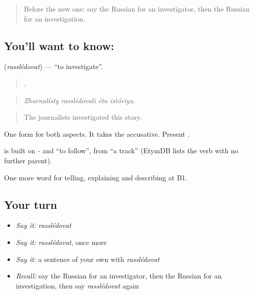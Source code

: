 \label{lesson:RU-C291-rassledovat}



\begin{quote}
Before the new one: say the Russian for an investigator, then the Russian for an investigation.
\end{quote}

\subsection*{You'll want to know: }
\textbf{} (\emph{rasslédovat}) — \textquotedblleft{}to investigate\textquotedblright{}.

\begin{quote}
   .
\end{quote}

\begin{quote}
\emph{Zhurnalísty rasslédovali étu istóriyu.}
\end{quote}

\begin{quote}
The journalists investigated this story.
\end{quote}

One form for both aspects. It takes the accusative. Present \emph{}.

\begin{cousinweb}
\emph{} is built on \emph{-} and \emph{} \textquotedblleft{}to follow\textquotedblright{}, from \emph{} \textquotedblleft{}a track\textquotedblright{} (EtymDB lists the verb with no further parent).
\end{cousinweb}

\begin{grammarlens}[title={What you've built}]
One more word for telling, explaining and describing at B1.
\end{grammarlens}

\subsection*{Your turn}
\begin{itemize}
\raggedright
  \item \emph{Say it:} \emph{rasslédovat}
  \item \emph{Say it:} \emph{rasslédovat}, once more
  \item \emph{Say it:} a sentence of your own with \emph{rasslédovat}
  \item \emph{Recall:} say the Russian for an investigator, then the Russian for an investigation, then say \emph{rasslédovat} again
\end{itemize}

